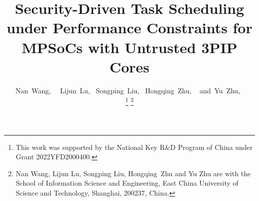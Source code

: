 \documentclass[10pt,journal, compsoc]{IEEEtran}
\begin{document}
%
\title{Security-Driven Task Scheduling under Performance Constraints for MPSoCs with Untrusted 3PIP Cores}
%
%
%
%

\author{Nan~Wang,~
        ~Lijun~Lu,%
        ~Songping~Liu,%
        ~Hongqing~Zhu, ~
        and~Yu~Zhu,~

\thanks{This work was supported by the National Key R\&D Program of China under Grant 2022YFD2000400.}
\thanks{Nan Wang, Lijun Lu, Songping Liu, Hongqing~Zhu and Yu Zhu are with the School of Information Science and Engineering, East China University of Science and Technology, Shanghai, 200237, China.}%
}
\end{document}
